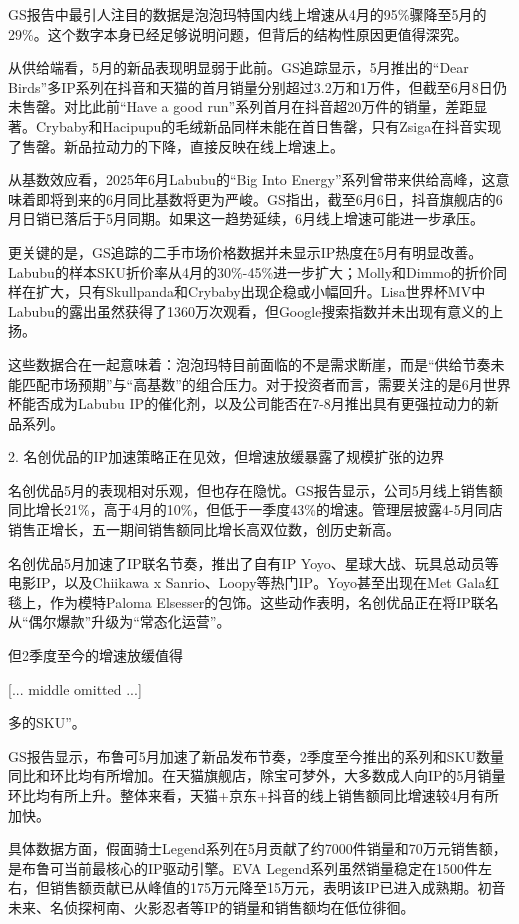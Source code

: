 \documentclass[11pt]{ctexart}
\begin{document}
GS报告中最引人注目的数据是泡泡玛特国内线上增速从4月的95\%骤降至5月的29\%。这个数字本身已经足够说明问题，但背后的结构性原因更值得深究。

从供给端看，5月的新品表现明显弱于此前。GS追踪显示，5月推出的“Dear Birds”多IP系列在抖音和天猫的首月销量分别超过3.2万和1万件，但截至6月8日仍未售罄。对比此前“Have a good run”系列首月在抖音超20万件的销量，差距显著。Crybaby和Hacipupu的毛绒新品同样未能在首日售罄，只有Zsiga在抖音实现了售罄。新品拉动力的下降，直接反映在线上增速上。

从基数效应看，2025年6月Labubu的“Big Into Energy”系列曾带来供给高峰，这意味着即将到来的6月同比基数将更为严峻。GS指出，截至6月6日，抖音旗舰店的6月日销已落后于5月同期。如果这一趋势延续，6月线上增速可能进一步承压。

更关键的是，GS追踪的二手市场价格数据并未显示IP热度在5月有明显改善。Labubu的样本SKU折价率从4月的30\%-45\%进一步扩大；Molly和Dimmo的折价同样在扩大，只有Skullpanda和Crybaby出现企稳或小幅回升。Lisa世界杯MV中Labubu的露出虽然获得了1360万次观看，但Google搜索指数并未出现有意义的上扬。

这些数据合在一起意味着：泡泡玛特目前面临的不是需求断崖，而是“供给节奏未能匹配市场预期”与“高基数”的组合压力。对于投资者而言，需要关注的是6月世界杯能否成为Labubu IP的催化剂，以及公司能否在7-8月推出具有更强拉动力的新品系列。

2. 名创优品的IP加速策略正在见效，但增速放缓暴露了规模扩张的边界

名创优品5月的表现相对乐观，但也存在隐忧。GS报告显示，公司5月线上销售额同比增长21\%，高于4月的10\%，但低于一季度43\%的增速。管理层披露4-5月同店销售正增长，五一期间销售额同比增长高双位数，创历史新高。

名创优品5月加速了IP联名节奏，推出了自有IP Yoyo、星球大战、玩具总动员等电影IP，以及Chiikawa x Sanrio、Loopy等热门IP。Yoyo甚至出现在Met Gala红毯上，作为模特Paloma Elsesser的包饰。这些动作表明，名创优品正在将IP联名从“偶尔爆款”升级为“常态化运营”。

但2季度至今的增速放缓值得

[... middle omitted ...]

多的SKU”。

GS报告显示，布鲁可5月加速了新品发布节奏，2季度至今推出的系列和SKU数量同比和环比均有所增加。在天猫旗舰店，除宝可梦外，大多数成人向IP的5月销量环比均有所上升。整体来看，天猫+京东+抖音的线上销售额同比增速较4月有所加快。

具体数据方面，假面骑士Legend系列在5月贡献了约7000件销量和70万元销售额，是布鲁可当前最核心的IP驱动引擎。EVA Legend系列虽然销量稳定在1500件左右，但销售额贡献已从峰值的175万元降至15万元，表明该IP已进入成熟期。初音未来、名侦探柯南、火影忍者等IP的销量和销售额均在低位徘徊。
\end{document}
